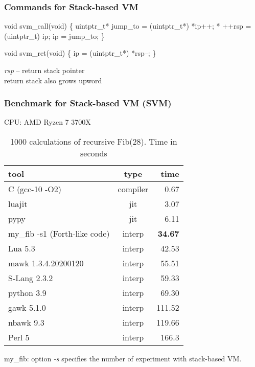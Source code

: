 \documentclass[hyperref={colorlinks=true},xcolor=table]{beamer}
\begin{document}
\begin{frame}[fragile]
  \frametitle{Commands for Stack-based VM}
  \begin{CodeNoLabel}
void svm_call(void) \{
    uintptr_t* jump_to = (uintptr_t*) *ip++;
    * ++rsp = (uintptr_t) ip;
    ip = jump_to;
\}

void svm_ret(void) \{
    ip = (uintptr_t*) *rsp--;
\}
  \end{CodeNoLabel}
  \textit{rsp} -- return stack pointer\\
  return stack also grows upword
\end{frame}

\smaller
\begin{frame}[fragile]
  \frametitle{Benchmark for Stack-based VM (SVM)}
  CPU: AMD Ryzen 7 3700X\break\break
  \begin{table}
    \begin{tabular}{ | l | c | r | }
      \hline
      \rowcolor{lightgray} tool & type & time \\
      \hline
      C (gcc-10 -O2) & compiler & 0.67 \\
      luajit & jit & 3.07 \\
      pypy & jit & 6.11 \\
      \hline
      my\_fib -s1 (Forth-like code) & interp & \textbf{34.67} \\
      Lua 5.3 & interp & 42.53 \\
      mawk 1.3.4.20200120 & interp & 55.51 \\
      S-Lang 2.3.2 & interp & 59.33 \\
      python 3.9 & interp & 69.30 \\
      gawk 5.1.0 & interp & 111.52 \\
      nbawk 9.3 & interp & 119.66 \\
      Perl 5 & interp & 166.3 \\
      \hline
    \end{tabular}
    \caption{1000 calculations of recursive Fib(28). Time in seconds}
  \end{table}
  my\_fib: option \textit{-s} specifies the number of experiment with
  stack-based VM.
\end{frame}
\normalsize
\end{document}
